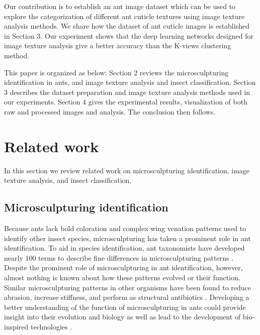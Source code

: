 \documentclass{aci}
\numberwithin{equation}{section}
\begin{document}
Our contribution is to establish an ant image dataset which can be used to
explore the categorization of different ant cuticle textures using image texture
analysis methods. We share how the dataset of ant cuticle images is established
in Section 3. Our experiment shows that the deep learning networks designed for
image texture analysis give a better accuracy than the K-views clustering
method.

This paper is organized as below:  Section 2 reviews the microsculpturing
identification in ants, and image texture analysis and insect classification.
Section 3 describes the dataset preparation and image texture analysis methods
used in our experiments. Section 4 gives the experimental results, visualization
of both raw and processed images and analysis. The conclusion then follows.

\section{Related work}

In this section we review related work on microsculpturing identification, image
texture analysis, and insect classification.

\subsection{Microsculpturing identification}

Because ants lack bold coloration and complex wing venation patterns used to
identify other insect species, microsculpturing has taken a prominent role in
ant identification. To aid in species identification, ant taxonomists have
developed nearly 100 terms to describe  fine differences in microsculpturing
patterns \cite{harris_glossary_1979, bolton_identification_1994}. Despite the
prominent role of microsculpturing in ant identification, however, almost
nothing is known about how these patterns evolved or their function. Similar
microsculpturing patterns in other organisms have been found to reduce abrasion,
increase stiffness, and perform as structural antibiotics
\cite{zhiwu_erosion_2012, han_efficient_2015, rees_form_1975,
    chung_impact_2007,hasan_selective_2013}. Developing a better understanding of
the function of microsculpturing in ants could provide insight into their
evolution and biology as well as lead to the development of bio-inspired
technologies \cite{penick_comparative_2022}.
\end{document}
